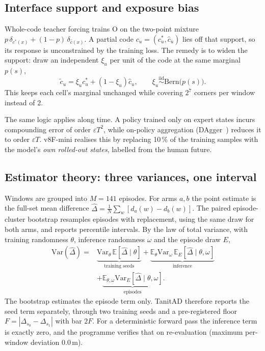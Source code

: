 \documentclass[10pt,twocolumn]{article}
\theoremstyle{remark}
\begin{document}
\subsection{Interface support and exposure bias}
Whole-code teacher forcing trains O on the two-point mixture $p\,\delta_{c^\ast(x)}+(1-p)\,\delta_{\hat c(x)}$. A partial code
$c_u=(c^\ast_u,\hat c_{\bar u})$ lies off that support, so its response is unconstrained by the training loss. The remedy is to widen
the support: draw an independent $\xi_u$ per unit of the code at the same marginal $p(s)$,
\begin{equation}
\tilde c_u=\xi_u c^\ast_u+(1-\xi_u)\hat c_u,\qquad \xi_u\stackrel{\mathrm{iid}}{\sim}\mathrm{Bern}\big(p(s)\big).
\end{equation}
This keeps each cell's marginal unchanged while covering $2^7$ corners per window instead of 2.

The same logic applies along time. A policy trained only on expert states incurs compounding error of order $\varepsilon T^2$, while
on-policy aggregation (DAgger~\cite{dagger}) reduces it to order $\varepsilon T$. v8F-mini realises this by replacing 10\,\% of the
training samples with the model's \emph{own rolled-out states}, labelled from the human future.

\subsection{Estimator theory: three variances, one interval}
Windows are grouped into $M=141$ episodes. For arms $a,b$ the point estimate is the full-set mean difference
$\hat\Delta=\frac1N\sum_w[d_a(w)-d_b(w)]$. The paired episode-cluster bootstrap resamples episodes with replacement, using the same
draw for both arms, and reports percentile intervals. By the law of total variance, with training randomness $\theta$, inference
randomness $\omega$ and the episode draw $E$,
\begin{equation}
\begin{aligned}
\mathrm{Var}(\hat\Delta)={}&\underbrace{\mathrm{Var}_\theta\,\mathbb E[\hat\Delta\mid\theta]}_{\text{training seeds}}+\underbrace{\mathbb E_\theta\mathrm{Var}_\omega\,\mathbb E_E[\hat\Delta\mid\theta,\omega]}_{\text{inference}}\\
&+\underbrace{\mathbb E_{\theta,\omega}\mathrm{Var}_E[\hat\Delta\mid\theta,\omega]}_{\text{episodes}} .
\end{aligned}
\end{equation}
The bootstrap estimates the episode term only. TanitAD therefore reports the seed term separately, through two training seeds and a
pre-registered floor $F=|\Delta_{s_0}-\Delta_{s_1}|$ with bar $2F$. For a deterministic forward pass the inference term is exactly zero,
and the programme verifies that on re-evaluation (maximum per-window deviation 0.0\,m).
\end{document}
